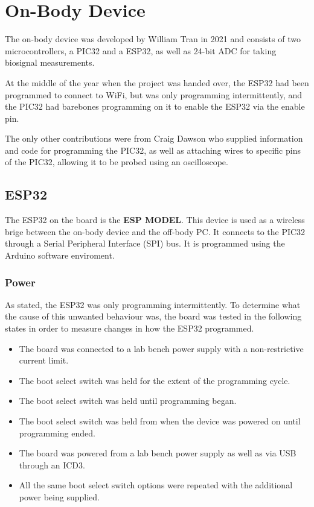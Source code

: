 \chapter{On-Body Device}
The on-body device was developed by William Tran in 2021 and consists of two microcontrollers,
a PIC32 and a ESP32, as well as 24-bit ADC for taking biosignal measurements.

At the middle of the year when the project was handed over,
the ESP32 had been programmed to connect to WiFi, but was only programming intermittently,
and the PIC32 had barebones programming on it to enable the ESP32 via the enable pin.

The only other contributions were from Craig Dawson who supplied information and code for programming the PIC32,
as well as attaching wires to specific pins of the PIC32, allowing it to be probed using an oscilloscope.


\section{ESP32}
The ESP32 on the board is the \textbf{ESP MODEL}.
This device is used as a wireless brige between the on-body device and the off-body PC.
It connects to the PIC32 through a Serial Peripheral Interface (SPI) bus.
It is programmed using the Arduino software enviroment.

\subsection{Power}
As stated, the ESP32 was only programming intermittently.
To determine what the cause of this unwanted behaviour was,
the board was tested in the following states in order to measure changes in how the ESP32 programmed.

\begin{itemize}
        \item The board was connected to a lab bench power supply with a non-restrictive current limit.
        \item The boot select switch was held for the extent of the programming cycle.
        \item The boot select switch was held until programming began.
        \item The boot select switch was held from when the device was powered on until programming ended.
        \item The board was powered from a lab bench power supply as well as via USB through an ICD3.
        \item All the same boot select switch options were repeated with the additional power being supplied.
\end{itemize}

